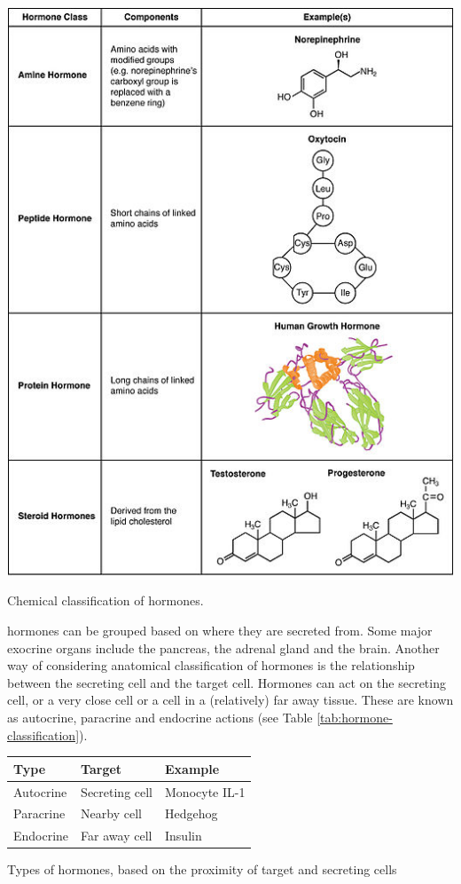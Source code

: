 \documentclass{tufte-handout}
\begin{document}
\begin{marginfigure}
  \includegraphics{figures/hormone-classification}
  \caption{Chemical classification of hormones.}
    \label{fig:chemical-classification}
\end{marginfigure}

 hormones can be grouped based on where they are secreted from.  Some major exocrine organs include the pancreas, the adrenal gland and the brain.  Another way of considering anatomical classification of hormones is the relationship between the secreting cell and the target cell.  Hormones can act on the secreting cell, or a very close cell or a cell in a (relatively) far away tissue.  These are known as autocrine, paracrine and endocrine actions (see Table \ref{tab:hormone-classification}).

\begin{margintable}
  \centering
  \begin{tabular}{lll}
    \toprule
    Type & Target & Example \\
    \midrule
    Autocrine & Secreting cell & Monocyte IL-1\\
    Paracrine & Nearby cell & Hedgehog \\
    Endocrine & Far away cell & Insulin \\
    \bottomrule
  \end{tabular}
  \caption{Types of hormones, based on the proximity of target and secreting cells}
  \label{tab:hormone-classification}
\end{margintable}
\end{document}

